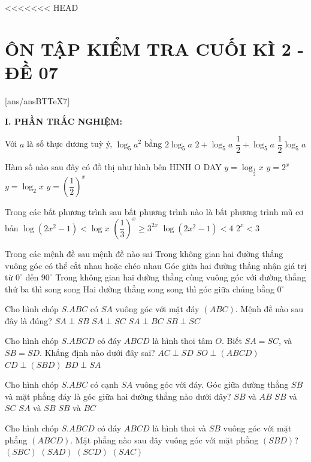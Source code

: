 <<<<<<< HEAD
\section*{ÔN TẬP KIỂM TRA CUỐI KÌ 2 - ĐỀ 07}
\setcounter{ex}{0}\setcounter{bt}{0}
[ans/ansBTTeX7]

\noindent\textbf{I. PHẦN TRẮC NGHIỆM:}
\begin{ex}
Với $a$ là số thực dương tuỳ ý, $\log _5a^2$ bằng
\choice
{$2\log _5a$}
{$2+\log _5a$}
{$\dfrac{1}{2}+\log _5a$}
{$\dfrac{1}{2}\log _5a$}
\end{ex}
\begin{ex}
Hàm số nào sau đây có đồ thị như hình bên
{\centering\color{red} HINH O DAY}
\choice
{$y=\log_{\tfrac{1}{2}}x$}
{$y=2^x$}
{$y=\log _2x$}
{$y=\left(\dfrac{1}{2}\right)^x$}
\end{ex}
\begin{ex}
Trong các bất phương trình sau bất phương trình nào là bất phương trình mũ cơ bản
\choice
{$\log \left(2x^2-1\right)<\log x$}
{${{\left(\dfrac{1}{3}\right)}^x}\ge {3^{2x}}$}
{$\log \left(2x^2-1\right)<4$}
{$2^x<3$}
\end{ex}
\begin{ex}
Trong các mệnh đề sau mệnh đề nào sai
\choice
{Trong không gian hai đường thẳng vuông góc có thể cắt nhau hoặc chéo nhau}
{Góc giữa hai đường thẳng nhận giá trị từ ${0^{\circ }}$ đến ${{90}^{\circ }}$}
{Trong không gian hai đường thẳng cùng vuông góc với đường thẳng thứ ba thì song song}
{Hai đường thẳng song song thì góc giữa chúng bằng ${0^{\circ }}$}
\end{ex}
\begin{ex}
Cho hình chóp $S.ABC$ có $SA$ vuông góc với mặt đáy $(ABC)$. Mệnh đề nào sau đây là đúng?
\choice
{$SA\perp SB$}
{$SA\perp SC$}
{$SA\perp BC$}
{$SB\perp SC$}
\end{ex}
\begin{ex}
Cho hình chóp $S.ABCD$ có đáy $ABCD$ là hình thoi tâm $O$. Biết $SA=SC$, và $SB=SD$. Khẳng định nào dưới đây sai?
\choice
{$AC\perp SD$}
{$SO\perp (ABCD)$}
{$CD\perp (SBD)$}
{$BD\perp SA$}
\end{ex}
\begin{ex}
Cho hình chóp $S.ABC$ có cạnh $SA$ vuông góc với đáy. Góc giữa đường thẳng $SB$ và mặt phẳng đáy là góc giữa hai đường thẳng nào dưới đây?
\choice
{$SB$ và $AB$}
{$SB$ và $SC$}
{$SA$ và $SB$}
{$SB$ và $BC$}
\end{ex}
\begin{ex}
Cho hình chóp $S.ABCD$ có đáy $ABCD$ là hình thoi và $SB$ vuông góc với mặt phẳng $(ABCD)$. Mặt phẳng nào sau đây vuông góc với mặt phẳng $(SBD)$?
\choice
{$(SBC)$}
{$(SAD)$}
{$(SCD)$}
{$(SAC)$}
\end{ex}
